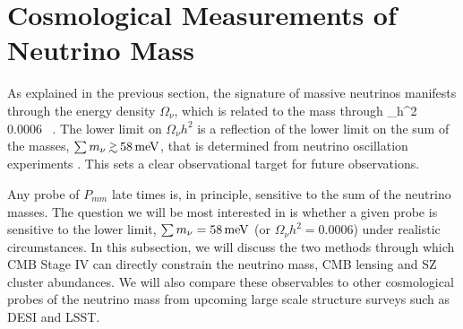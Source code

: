 \section{Cosmological Measurements of Neutrino Mass} \label{sec:mnuobs}


As explained in the previous section,  the signature of massive neutrinos manifests through
the energy density $\Omega_\nu$, which is related to the mass through
\beq
\Omega_\nu h^2 \simeq \,  \, \gtrsim  \, 0.0006  \ .
\eeq
The lower limit on $\Omega_\nu h^2$ is a reflection of the lower limit on the sum of the masses, $\sum m_\nu \, \gtrsim  \, 58 \, {\rm meV}$, that is determined from neutrino oscillation experiments \cite{Agashe:2014kda}.  This sets a clear observational target for future observations.

Any probe of $P_{mm}$ late times is, in principle, sensitive to the sum of the neutrino masses.  The question we will be most interested in is whether a given probe is sensitive to the lower limit, $\sum m_\nu = 58 \, {\rm meV}$ (or $\Omega_\nu h^2 = 0.0006$) under realistic circumstances.  In this subsection, we will discuss the two methods through which CMB Stage IV can directly constrain the neutrino mass, CMB lensing and SZ cluster abundances.  We will also compare these observables to other cosmological probes of the neutrino mass from upcoming large scale structure surveys such as DESI and LSST.



